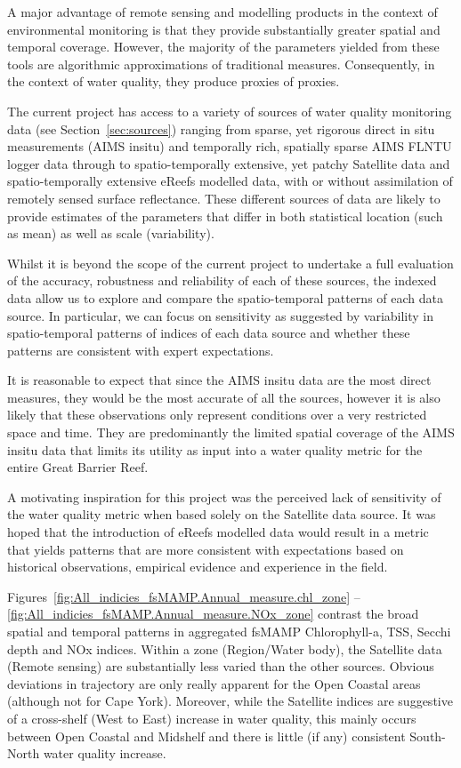 A major advantage of remote sensing and modelling products in the context of environmental
monitoring is that they provide substantially greater spatial and temporal coverage.  However, the
majority of the parameters yielded from these tools are algorithmic approximations of traditional
measures.  Consequently, in the context of water quality, they produce proxies of proxies.

The current project has access to a variety of sources of water quality monitoring data (see
Section~\ref{sec:sources}) ranging from sparse, yet rigorous direct in situ measurements (AIMS insitu) and
temporally rich, spatially sparse AIMS FLNTU logger data through to spatio-temporally extensive, yet
patchy Satellite data and spatio-temporally extensive eReefs modelled data, with or without assimilation
of remotely sensed surface reflectance.  These
different sources of data are likely to provide estimates of the parameters that differ in both
statistical location (such as mean) as well as scale (variability).

Whilst it is beyond the scope of the current project to undertake a full evaluation of the accuracy,
robustness and reliability of each of these sources, the indexed data allow us to explore and
compare the spatio-temporal patterns of each data source.  In particular, we can focus on
sensitivity as suggested by variability in spatio-temporal patterns of indices of each data source
and whether these patterns are consistent with expert expectations.

It is reasonable to expect that since the AIMS insitu data are the most direct measures, they would
be the most accurate of all the sources, however it is also likely that these observations only
represent conditions over a very restricted space and time.  They are predominantly
the limited spatial coverage of the AIMS insitu data that limits its utility as input into a water
quality metric for the entire Great Barrier Reef.

A motivating inspiration for this project was the perceived lack of sensitivity of the water quality
metric when based solely on the Satellite data source.  It was
hoped that the introduction of eReefs modelled data would result in a metric that yields patterns
that are more consistent with expectations based on historical observations, empirical evidence and
experience in the field.

Figures~\ref{fig:All_indicies_fsMAMP.Annual_measure.chl_zone} --
\ref{fig:All_indicies_fsMAMP.Annual_measure.NOx_zone} contrast the broad spatial and temporal
patterns in aggregated fsMAMP Chlorophyll-a, TSS, Secchi depth and NOx indices.  Within a zone
(Region/Water body), the Satellite data (Remote sensing) are substantially less varied than the
other sources.  Obvious deviations in trajectory are only really apparent for the Open Coastal areas
(although not for Cape York).  Moreover, while the Satellite indices are suggestive of a cross-shelf
(West to East) increase in water quality, this mainly occurs between Open Coastal and Midshelf and
there is little (if any) consistent South-North water quality increase.

